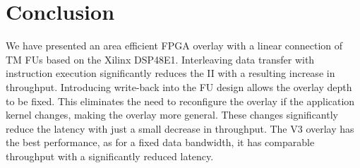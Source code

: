 \section{Conclusion}
\label{ch6_conclusion}
We have presented an area efficient FPGA overlay with a linear connection of TM FUs based on the Xilinx DSP48E1.
Interleaving data transfer with instruction execution significantly reduces the II with a resulting increase in throughput.
Introducing write-back into the FU design allows the overlay depth to be fixed. 
This eliminates the need to reconfigure the overlay if the application kernel changes, making the overlay more general. These changes significantly reduce the latency with just a small decrease in throughput.
The V3 overlay has the best performance, as for a fixed data bandwidth, it has comparable throughput with a significantly reduced latency.


